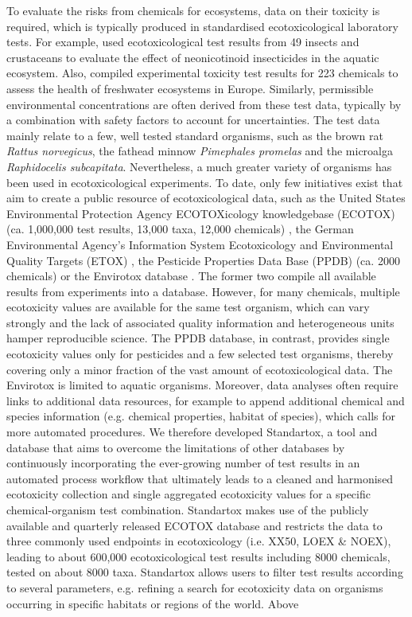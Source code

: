 To evaluate the risks from chemicals for ecosystems, data on their toxicity is required, which is typically produced in standardised ecotoxicological laboratory tests. For example, \citet{morrissey_neonicotinoid_2015} used ecotoxicological test results from 49 insects and crustaceans to evaluate the effect of neonicotinoid insecticides in the aquatic ecosystem. Also, \citet{malaj_organic_2014} compiled experimental toxicity test results for 223 chemicals to assess the health of freshwater ecosystems in Europe. Similarly, permissible environmental concentrations are often derived from these test data, typically by a combination with safety factors to account for uncertainties. The test data mainly relate to a few, well tested standard organisms, such as the brown rat \textit{Rattus norvegicus}, the fathead minnow \textit{Pimephales promelas} and the microalga \textit{Raphidocelis subcapitata}. Nevertheless, a much greater variety of organisms has been used in ecotoxicological experiments. To date, only few initiatives exist that aim to create a public resource of ecotoxicological data, such as the United States Environmental Protection Agency ECOTOXicology knowledgebase (ECOTOX) (ca. 1,000,000 test results, 13,000 taxa, 12,000 chemicals) \citep{elonen_ecotoxicology_2018}, the German Environmental Agency's Information System Ecotoxicology and Environmental Quality Targets (ETOX) \citep{umweltbundesamt_etox_2019}, the Pesticide Properties Data Base (PPDB) (ca. 2000 chemicals) \citep{lewis_international_2016} or the Envirotox database \citep{healthandenvironmentalsciencesinstitutehesi_envirotox_2019, connors_creation_2019}. The former two compile all available results from experiments into a database. However, for many chemicals, multiple ecotoxicity values are available for the same test organism, which can vary strongly and the lack of associated quality information and heterogeneous units hamper reproducible science. The PPDB database, in contrast, provides single ecotoxicity values only for pesticides and a few selected test organisms, thereby covering only a minor fraction of the vast amount of ecotoxicological data. The Envirotox is limited to aquatic organisms. Moreover, data analyses often require links to additional data resources, for example to append additional chemical and species information (e.g. chemical properties, habitat of species), which calls for more automated procedures. We therefore developed Standartox, a tool and database that aims to overcome the limitations of other databases by continuously incorporating the ever-growing number of test results in an automated process workflow that ultimately leads to a cleaned and harmonised ecotoxicity collection and single aggregated ecotoxicity values for a specific chemical-organism test combination. Standartox makes use of the publicly available and quarterly released ECOTOX database \citep{usepa_ecotox_2019} and restricts the data to three commonly used endpoints in ecotoxicology (i.e. XX50, LOEX \& NOEX), leading to about 600,000 ecotoxicological test results including 8000 chemicals, tested on about 8000 taxa. Standartox allows users to filter test results according to several parameters, e.g. refining a search for ecotoxicity data on organisms occurring in specific habitats or regions of the world. Above 